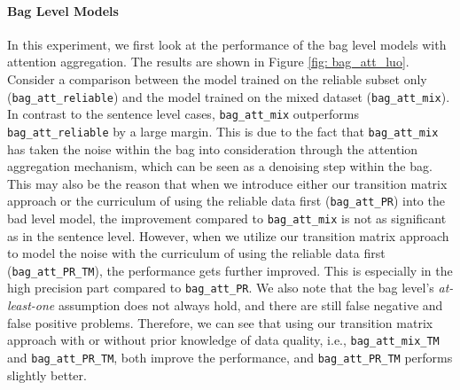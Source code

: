 \paragraph{Bag Level Models}
In this experiment, we first look at the performance of the bag level models with attention aggregation. The results are shown in Figure \ref{fig: bag_att_luo}.
Consider a comparison between the  model trained on the reliable subset only (\texttt{bag\_att\_reliable}) and the model trained on the mixed dataset (\texttt{bag\_att\_mix}).
In contrast to the sentence level cases, \texttt{bag\_att\_mix} outperforms \texttt{bag\_att\_reliable} by a large margin. This is due to the fact that \texttt{bag\_att\_mix} has taken the noise within the bag into consideration through the attention aggregation mechanism, which can be seen as a denoising step within the bag.
This may also be the reason that when we introduce either our transition matrix approach   or the curriculum of using the reliable data first (\texttt{bag\_att\_PR}) into the bad level model, the improvement compared to \texttt{bag\_att\_mix}  is not as significant as in the sentence level.
However, when we utilize our transition matrix approach to model the noise with the curriculum of using the reliable data first (\texttt{bag\_att\_PR\_TM}), the performance gets further improved. This is especially in the high precision part compared to \texttt{bag\_att\_PR}.
We also note that the bag level's \textit{at-least-one} assumption does not always hold, and there are still false negative and false positive problems. Therefore, we can see that using our transition matrix approach with or without prior knowledge of data quality, i.e., \texttt{bag\_att\_mix\_TM}  and \texttt{bag\_att\_PR\_TM}, both improve the performance, and \texttt{bag\_att\_PR\_TM} performs slightly better.

